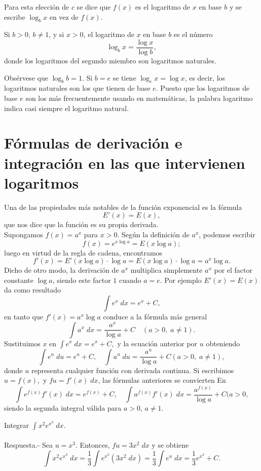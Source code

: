Para esta elección de $c$ se dice que $f(x)$ es el logaritmo de $x$ en base $b$ y se escribe $\log_b x$ en vez de $f(x)$.

\begin{def.}
    Si $b>0$, $b\neq 1$, y si $x>0$, el logaritmo de $x$ en base $b$ es el número
    $$\log_b x = \dfrac{\log x}{\log b},$$
    donde los logaritmos del segundo miembro son logaritmos naturales.
\end{def.}

Obsérvese que $\log_b b = 1$. Si $b=e$ se tiene $\log_e x= \log x$, es decir, los logaritmos naturales son los que tienen de base $e$. Puesto que los logaritmos de base $e$ son los más frecuentemente usando en matemáticas, la palabra logaritmo indica casi siempre el logaritmo natural.


\section{Fórmulas de derivación e integración en las que intervienen logaritmos}
Una de las propiedades más notables de la función exponencial es la fórmula
$$E'(x)=E(x),$$
que nos dice que la función es su propia derivada. \\

Supongamos $f(x)=a^x$ para $x>0$. Según la definición de $a^x$, podemos escribir
$$f(x)=e^{x\log a}=E(x\log a);$$
luego en virtud de la regla de cadena, encontramos
$$f'(x)=E'(x\log a )\cdot \log a=E(x\log a)\cdot \log a=a^x\log a.$$
Dicho de otro modo, la derivación de $a^x$ multiplica simplemente $a^x$ por el factor constante $\log a$, siendo este factor $1$ cuando $a=e$. Por ejemplo $E'(x)=E(x)$ da como resultado 
$$\int e^x \; dx = e^x+C,$$
en tanto que $f'(x)=a^x\log a$ conduce a la fórmula más general
$$\int a^x \; dx = \dfrac{a^x}{\log a}+C \quad (a>0,\; a\neq 1).$$
Sustituimos $x$ en $\int e^x \; dx = e^x+C,$ y la ecuación anterior por $u$ obteniendo
$$\int e^u \; du = e^u+C, \quad \int a^u \; du = \dfrac{a^u}{\log a}+C (a>0,\; a\neq 1),$$
donde $u$ representa cualquier función con derivada continua. Si escribimos $u=f(x),$ y $fu=f'(x)\; dx$, las fórmulas anteriores se convierten En
$$\int e^{f(x)} f'(x) \; dx = e^{f(x)}+C, \quad \int a^{f(x)} f'(x) \; dx = \dfrac{a^{f(x)}}{\log a}+C (a>0,$$
siendo la segunda integral válida para $a>0$, $a\neq 1$.

\begin{ejem}
    Integrar $\displaystyle\int x^2e^{x^3}\;dx.$\\\\
	Respuesta.-\; Sea $u=x^3$. Entonces, $fu=3x^2\; dx$  y se obtiene
	$$\int x^2e^{x^3}\; dx = \dfrac{1}{3}\int e^{x^3}(3x^2\; dx)=\dfrac{1}{3}\int e^u\; dx = \dfrac{1}{3}e^{x^3}+C.$$
\end{ejem}



